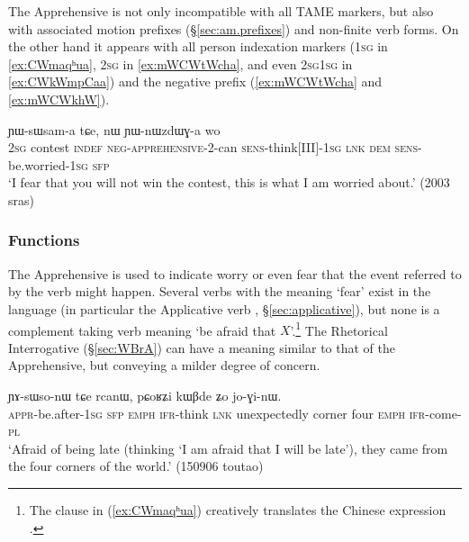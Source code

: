The Apprehensive is not only incompatible with all TAME markers, but also with associated motion prefixes (§\ref{sec:am.prefixes}) and non-finite verb forms. On the other hand it appears with all person indexation markers (\textsc{1sg} in \ref{ex:CWmaqʰua}, \textsc{2sg} in \ref{ex:mWCWtWcha}, and even 2\textsc{sg}\fl{}1\textsc{sg} in \ref{ex:CWkWmpCaa}) and the negative prefix  (\ref{ex:mWCWtWcha} and \ref{ex:mWCWkhW}). 

  \begin{exe}
\ex \label{ex:mWCWtWcha}
 ɲɯ-sɯsam-a tɕe, nɯ ɲɯ-nɯzdɯɣ-a wo \\
\textsc{2sg} contest \textsc{indef} \textsc{neg}-\textsc{apprehensive}-2-can \textsc{sens}-think[III]-\textsc{1sg} \textsc{lnk} \textsc{dem} \textsc{sens}-be.worried-\textsc{1sg} \textsc{sfp} \\
\glt  `I fear that you will not win the contest, this is what I am worried about.' (2003 sras)
 \end{exe}

\subsubsection{Functions} \label{sec:apprehensive.function}
The Apprehensive is used to indicate worry or even fear that the event referred to by the verb might happen. Several verbs with the meaning `fear' exist in the language (in particular the Applicative verb , §\ref{sec:applicative}), but none is a complement taking verb meaning `be afraid that $X$'.\footnote{The clause     in (\ref{ex:CWmaqʰua}) creatively translates the Chinese expression . }     The Rhetorical Interrogative (§\ref{sec:WBrA}) can have a meaning similar to that of the Apprehensive, but conveying a milder degree of concern.

\begin{exe}
\ex \label{ex:CWmaqʰua}
\gll  [ɕɯ-maqʰu-a kɯ ʑo] ɲɤ-sɯso-nɯ tɕe rcanɯ, pɕoʁʑi kɯβde ʑo jo-ɣi-nɯ.  \\
\textsc{appr}-be.after-\textsc{1sg} \textsc{sfp} \textsc{emph} \textsc{ifr}-think \textsc{lnk} unexpectedly corner four \textsc{emph} \textsc{ifr}-come-\textsc{pl} \\
\glt `Afraid of being late (thinking `I am afraid that I will be late'), they came from the four corners of the world.' (150906 toutao)
 \end{exe}
 
